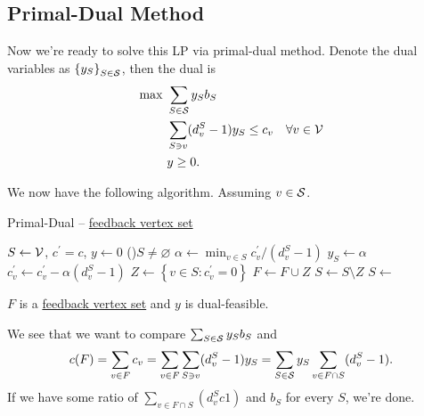 \subsection{Primal-Dual Method}

Now we're ready to solve this LP via primal-dual method. Denote the dual variables as \(\left\{ y_S \right\} _{S\in \mathcal{\MakeUppercase{S}} }\), then the dual is
\begin{align*}
	\max~ & \sum_{S\in \mathcal{\MakeUppercase{S}} } y_S b_S                                      \\
	      & \sum_{S\ni v}(d_{v} ^S - 1)y_S \leq c_v\quad \forall v\in \mathcal{\MakeUppercase{v}} \\
	      & y\geq 0.
\end{align*}

We now have the following algorithm. Assuming \(v\in \mathcal{\MakeUppercase{S}} \). \par

\begin{algorithm}[H]\label{algo:feedback-vertex-set-PD}
	\DontPrintSemicolon
	\caption{Primal-Dual -- \hyperref[prb:feedback-vertex-set]{feedback vertex set}}
	\BlankLine

	\(S\gets \mathcal{\MakeUppercase{v}} \), \(c^\prime = c\), \(y\gets 0\)\;
	\While(){\(S \neq \varnothing \)}{
		\(\alpha \gets \min _{v\in S} c^\prime _v / (d_v^S - 1)\)\;
		\(y_S\gets \alpha \)\;
		\(c^\prime _v\gets c^\prime _v - \alpha (d_v^S - 1)\)\;
		\(Z\gets \left\{ v\in S\colon c^\prime _v = 0 \right\} \)\;
		\(F\gets F\cup Z\)\;
		\(S\gets S \setminus Z\)\;
		\(S\gets\) 
	}
	\;
\end{algorithm}

\begin{note}
	\(F\) is a \hyperref[prb:feedback-vertex-set]{feedback vertex set} and \(y\) is dual-feasible.
\end{note}

We see that we want to compare \(\sum_{S\in \mathcal{\MakeUppercase{S}} }y_S b_S\) and
\[
	c(F) = \sum_{v\in F}c_v = \sum_{v\in F}\sum_{S\ni v} (d_{v} ^S - 1) y_S = \sum_{S\in \mathcal{\MakeUppercase{S}}}y_S \sum_{v\in F \cap S}(d_{v} ^S - 1).
\]
If we have some ratio of \(\sum_{v\in F \cap S}(d_{v} ^S c 1)\) and \(b_S\) for every \(S\), we're done.

